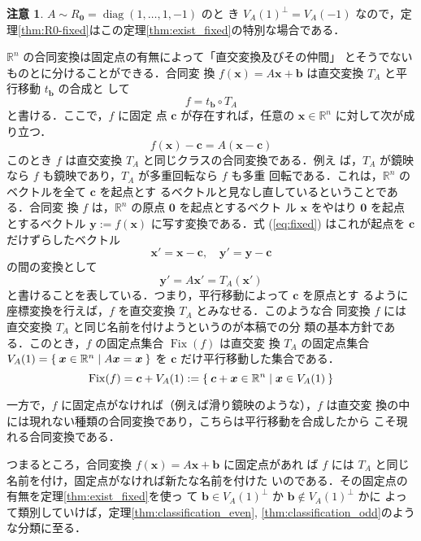 \documentclass[11pt, uplatex, dvipdfmx, titlepage]{jsarticle}
\DeclareMathOperator{\Fix}{Fix}
\DeclareMathOperator{\diag}{diag}
\theoremstyle{definition}
\newtheorem*{remark}{注意}
\begin{document}
\begin{remark}
  $A \sim R_{\bm{0}}=\diag(1, \ldots, 1, -1)$ のと
  き $V_A(1)^{\perp}=V_A(-1)$ なので，定
  理\ref{thm:R0-fixed}はこの定理\ref{thm:exist_fixed}の特別な場合である．
\end{remark}


$\mathbb{R}^n$ の合同変換は固定点の有無によって「直交変換及びその仲間」
とそうでないものとに分けることができる．合同変
換 $f(\bm{x}) = A\bm{x} + \bm{b}$ は直交変換 $T_A$ と平行移動 $t_{\bm{b}}$ の合成と
して
\[
  f = t_{\bm{b}} \circ T_A
\]
と書ける．ここで，$f$ に固定
点 $\bm{c}$ が存在すれば，任意の $\bm{x} \in \mathbb{R}^n$ に対して次が成り立つ．
\begin{equation}\label{eq:fixed}
  f(\bm{x})-\bm{c}  = A(\bm{x} - \bm{c})  
\end{equation}
このとき $f$ は直交変換 $T_A$ と同じクラスの合同変換である．例え
ば，$T_A$ が鏡映なら $f$ も鏡映であり，$T_A$ が多重回転なら $f$ も多重
回転である．これは，$\mathbb{R}^n$ のベクトルを全て $\bm{c}$ を起点とす
るベクトルと見なし直しているということである．合同変
換 $f$ は，$\mathbb{R}^n$ の原点 $\bm{0}$ を起点とするベクト
ル $\bm{x}$ をやはり $\bm{0}$ を起点とするベクトル $\bm{y}:=
f(\bm{x})$ に写す変換である．式 (\ref{eq:fixed})
はこれが起点を $\bm{c}$ だけずらしたベクトル
\[
  \bm{x}'= \bm{x} - \bm{c}, \quad \bm{y}'=\bm{y}-\bm{c}
\]
の間の変換として
\[
  \bm{y}' = A\bm{x}' = T_A(\bm{x}')
\]
と書けることを表している．つまり，平行移動によって $\bm{c}$ を原点とす
るように座標変換を行えば，$f$ を直交変換 $T_A$ とみなせる．このような合
同変換 $f$ には直交変換 $T_A$ と同じ名前を付けようというのが本稿での分
類の基本方針である．このとき，$f$ の固定点集合 $\Fix(f)$ は直交変
換 $T_A$ の固定点集合
$V_A(1)=\Set{\bm{x} \in \mathbb{R}^n | A\bm{x} = \bm{x}}$ を $\bm{c}$
だけ平行移動した集合である．
\[
  \Fix(f) = \bm{c} + V_A(1) :=\Set{ \bm{c} + \bm{x}  \in \mathbb{R}^n | \bm{x} \in V_A(1)}
\]

一方で，$f$ に固定点がなければ（例えば滑り鏡映のような），$f$ は直交変
換の中には現れない種類の合同変換であり，こちらは平行移動を合成したから
こそ現れる合同変換である．

つまるところ，合同変換 $f(\bm{x}) = A\bm{x} + \bm{b}$ に固定点があれ
ば $f$ には $T_A$ と同じ名前を付け，固定点がなければ新たな名前を付けた
いのである．その固定点の有無を定理\ref{thm:exist_fixed}を使っ
て $\bm{b} \in V_A(1)^{\perp}$ か $\bm{b} \not\in V_A(1)^{\perp}$ かに
よって類別していけば，定理\ref{thm:classification_even},
\ref{thm:classification_odd}のような分類に至る．
\end{document}
